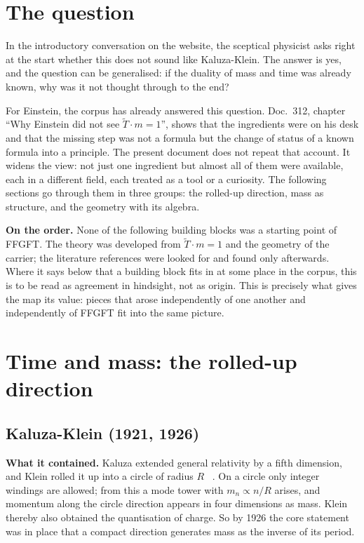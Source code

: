 \section{The question}

In the introductory conversation on the website, the sceptical physicist asks right at the start
whether this does not sound like Kaluza-Klein. The answer is yes, and the question can be
generalised: if the duality of mass and time was already known, why was it not thought through to
the end?

For Einstein, the corpus has already answered this question. Doc.~312, chapter \enquote{Why
Einstein did not see $\tilde T\cdot m=1$}, shows that the ingredients were on his desk and that the
missing step was not a formula but the change of status of a known formula into a principle. The
present document does not repeat that account. It widens the view: not just one ingredient but
almost all of them were available, each in a different field, each treated as a tool or a
curiosity. The following sections go through them in three groups: the rolled-up direction, mass
as structure, and the geometry with its algebra.

\textbf{On the order.} None of the following building blocks was a starting point of FFGFT. The
theory was developed from $\tilde T\cdot m=1$ and the geometry of the carrier; the literature
references were looked for and found only afterwards. Where it says below that a building block fits
in at some place in the corpus, this is to be read as agreement in hindsight, not as origin. This is
precisely what gives the map its value: pieces that arose independently of one another and
independently of FFGFT fit into the same picture.

\section{Time and mass: the rolled-up direction}

\subsection{Kaluza-Klein (1921, 1926)}

\textbf{What it contained.} Kaluza extended general relativity by a fifth dimension, and Klein
rolled it up into a circle of radius $R$ \QM~\cite{Kaluza1921,Klein1926}. On a circle only integer
windings are allowed; from this a mode tower with $m_n\propto n/R$ arises, and momentum along the
circle direction appears in four dimensions as mass. Klein thereby also obtained the quantisation
of charge. So by 1926 the core statement was in place that a compact direction generates mass as
the inverse of its period.

